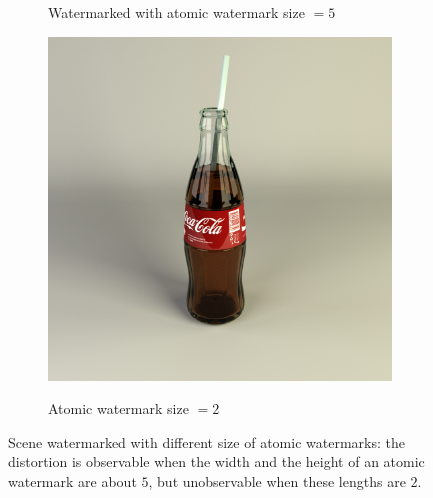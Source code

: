 \begin{figure}[ht]
{\begin{subfigure}[t]{0.4\textwidth}
        \label{subfig:coca_cola_wm_ko}
        \caption{Watermarked with atomic watermark size $= 5$}
    \end{subfigure}
    \begin{subfigure}[t]{0.4\textwidth}
        \centering
        \includegraphics[width=\textwidth]{coca_cola_wm_ok.png}
        \label{subfig:coca_cola_wm_ok}
        \caption{Atomic watermark size $= 2$}
    \end{subfigure}}
    \caption[Scene watermarked with different sizes of atomic watermarks]{Scene watermarked with different size of atomic watermarks: the distortion is observable when the width and the height of an atomic watermark are about $5$, but unobservable when these lengths are $2$.}
    \label{fig:coca_cola}
\end{figure}


